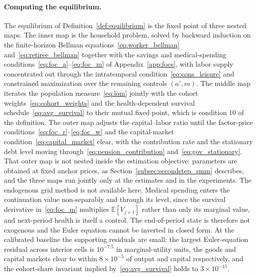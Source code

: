 \documentclass[12pt,a4paper]{article}
\newcommand{\E}{\mathbb{E}}
\begin{document}
\begin{appendices}
\paragraph{Computing the equilibrium.} The equilibrium of Definition~\ref{def:equilibrium} is the fixed point of three nested maps. The inner map is the household problem, solved by backward induction on the finite-horizon Bellman equations~\eqref{eq:worker_bellman} and~\eqref{eq:retiree_bellman} together with the savings and medical-spending conditions~\eqref{eq:foc_a}--\eqref{eq:foc_m} of Appendix~\ref{app:focs}, with labor supply concentrated out through the intratemporal condition~\eqref{eq:cons_leisure} and constrained maximization over the remaining controls $(a', m)$. The middle map iterates the population measure~\eqref{eq:lom} jointly with the cohort weights~\eqref{eq:cohort_weights} and the health-dependent survival schedule~\eqref{eq:avg_survival} to their mutual fixed point, which is condition 10 of the definition. The outer map adjusts the capital--labor ratio until the factor-price conditions~\eqref{eq:foc_r}--\eqref{eq:foc_w} and the capital-market condition~\eqref{eq:capital_market} clear, with the contribution rate and the stationary debt level moving through~\eqref{eq:pension_contribution} and~\eqref{eq:gov_stationary}. That outer map is not nested inside the estimation objective: parameters are obtained at fixed anchor prices, as Section~\ref{subsec:secondstep_smm} describes, and the three maps run jointly only at the estimates and in the experiments.  The endogenous grid method is not available here. Medical spending enters the continuation value non-separably and through its level, since the survival derivative in~\eqref{eq:foc_m} multiplies $\E[V_{j+1}]$ rather than only its marginal value, and next-period health is itself a control. The end-of-period state is therefore not exogenous and the Euler equation cannot be inverted in closed form. At the calibrated baseline the supporting residuals are small: the largest Euler-equation residual across interior cells is $10^{-7.5}$ in marginal-utility units, the goods and capital markets clear to within $8\times10^{-5}$ of output and capital respectively, and the cohort-share invariant implied by~\eqref{eq:avg_survival} holds to $3\times10^{-15}$.


\end{appendices}
\end{document}
